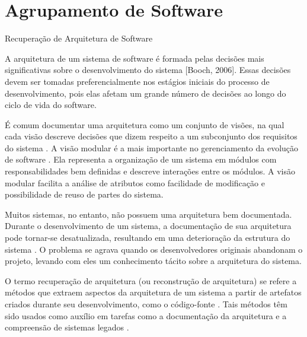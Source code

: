%
% 

\chapter{Agrupamento de Software} %


\begin{section}{Recuperação de Arquitetura de Software}

A arquitetura de um sistema de software é formada pelas decisões mais significativas sobre o desenvolvimento do sistema [Booch, 2006]. Essas decisões devem ser tomadas preferencialmente nos estágios iniciais do processo de desenvolvimento, pois elas afetam um grande número de decisões ao longo do ciclo de vida do software.

É comum documentar uma arquitetura como um conjunto de visões, na qual cada visão descreve decisões que dizem respeito a um subconjunto dos requisitos do sistema \cite{Clements2002}. A visão modular é a mais importante no gerenciamento da evolução de software \cite{Parnas1972}. Ela representa a organização de um sistema em módulos com responsabilidades bem definidas e descreve interações entre os módulos. A visão modular facilita a análise de atributos como facilidade de modificação e possibilidade de reuso de partes do sistema.

Muitos sistemas, no entanto, não possuem uma arquitetura bem documentada. Durante o desenvolvimento de um sistema, a documentação de sua arquitetura pode tornar-se desatualizada, resultando em uma deterioração da estrutura do sistema \cite{Parnas1994,Eick2001}. O problema se agrava quando os desenvolvedores originais abandonam o projeto, levando com eles um conhecimento tácito sobre a arquitetura do sistema.

O termo recuperação de arquitetura (ou reconstrução de arquitetura) se refere a métodos que extraem aspectos da arquitetura de um sistema a partir de artefatos criados durante seu desenvolvimento, como o código-fonte \cite{Pollet2007}. Tais métodos têm sido usados como auxílio em tarefas como a documentação da arquitetura e a compreensão de sistemas legados \cite{Wu2005}.


\end{section}
